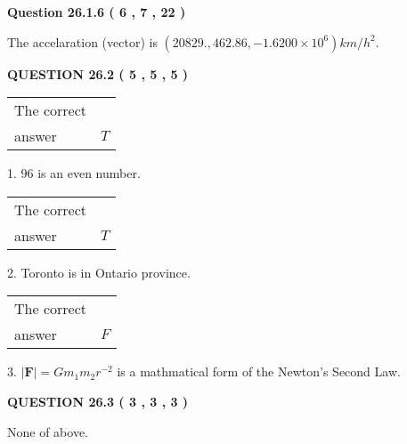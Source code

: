 \documentclass[12pt]{article}
\begin{document}
{\textbf{\Large{Question
26.1.6 
 (           6 ,           7 ,          22 )
}}}
  
  
 
 
\noindent{}
 
 
The accelaration (vector) is
$(
20829.,
462.86 ,
-1.6200 \times 10^{6}
)km/h^2.
$
 
 
 
 
  
\vspace{0.2in}
  
{\textbf{\Large{QUESTION
26.2 
 (           5 ,           5 ,           5 )
}}}
  
  
 
 
\noindent{}

 
\noindent\begin{tabular}{|l|l|}\hline The correct & \\
          answer &  %
$T$ \\ \hline \end{tabular}
1. $ %
96$ is an  %
even number.
 
\noindent\begin{tabular}{|l|l|}\hline The correct & \\
          answer &  %
$T$ \\ \hline \end{tabular}
2.  %
Toronto is in  %
Ontario province.
 
\noindent\begin{tabular}{|l|l|}\hline The correct & \\
          answer &  %
$F$ \\ \hline \end{tabular}
3.  %
$\left| \mathbf{F}\right| =Gm_1m_2r^{-2}$ is a mathmatical form of  %
the Newton's Second Law.
 
 
 
  
\vspace{0.2in}
  
{\textbf{\Large{QUESTION
26.3 
 (           3 ,           3 ,           3 )
}}}
  
  
 
 
\noindent{}
 
 
 None of above.
 
\end{document}
